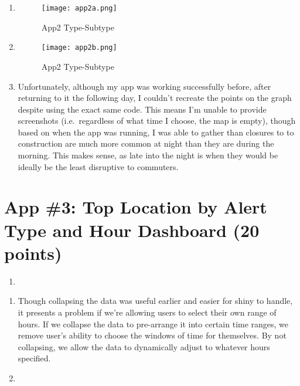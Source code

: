 \documentclass[
  letterpaper,
  DIV=11,
  numbers=noendperiod]{scrartcl}
\providecommand{\tightlist}{%
  \setlength{\itemsep}{0pt}\setlength{\parskip}{0pt}}\usepackage{longtable,booktabs,array}
\begin{document}
\begin{enumerate}
\def\labelenumi{\alph{enumi}.}
\item
  \begin{figure}[H]

  {\centering \texttt{[image: app2a.png]}

  }

  \caption{App2 Type-Subtype}

  \end{figure}%
\item
  \begin{figure}[H]

  {\centering \texttt{[image: app2b.png]}

  }

  \caption{App2 Type-Subtype}

  \end{figure}%
\item
  Unfortunately, although my app was working successfully before, after
  returning to it the following day, I couldn't recreate the points on
  the graph despite using the exact same code. This means I'm unable to
  provide screenshots (i.e.~regardless of what time I choose, the map is
  empty), though based on when the app was running, I was able to gather
  than closures to to construction are much more common at night than
  they are during the morning. This makes sense, as late into the night
  is when they would be ideally be the least disruptive to commuters.
\end{enumerate}

\section*{App \#3: Top Location by Alert Type and Hour Dashboard (20
points)}\label{app-3-top-location-by-alert-type-and-hour-dashboard-20-points}

\begin{enumerate}
\def\labelenumi{\arabic{enumi}.}
\tightlist
\item
\end{enumerate}

\begin{enumerate}
\def\labelenumi{\alph{enumi}.}
\item
  Though collapsing the data was useful earlier and easier for shiny to
  handle, it presents a problem if we're allowing users to select their
  own range of hours. If we collapse the data to pre-arrange it into
  certain time ranges, we remove user's ability to choose the windows of
  time for themselves. By not collapsing, we allow the data to
  dynamically adjust to whatever hours specified.
\item
\end{enumerate}
\end{document}
